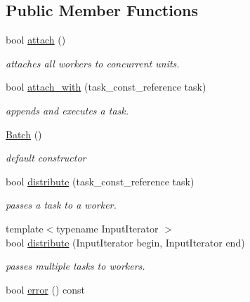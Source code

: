 \subsection*{Public Member Functions}
\begin{DoxyCompactItemize}
\item 
bool \hyperlink{classhryky_1_1task_1_1distributor_1_1_base_ae17d5723d8aa5567ea6a47b67f8133c4}{attach} ()
\begin{DoxyCompactList}\small\item\em attaches all workers to concurrent units. \end{DoxyCompactList}\item 
bool \hyperlink{group__task_ga54ecf037362d5f476c1cd9a984c1b720}{attach\-\_\-with} (task\-\_\-const\-\_\-reference task)
\begin{DoxyCompactList}\small\item\em appends and executes a task. \end{DoxyCompactList}\item 
\hyperlink{group__task_gabc2230b47631c13cfaa63fe5438b2b7f}{Batch} ()
\begin{DoxyCompactList}\small\item\em default constructor \end{DoxyCompactList}\item 
bool \hyperlink{group__task_gaaa80eb88fb7d7223214dd039ae52ed16}{distribute} (task\-\_\-const\-\_\-reference task)
\begin{DoxyCompactList}\small\item\em passes a task to a worker. \end{DoxyCompactList}\item 
{\footnotesize template$<$typename Input\-Iterator $>$ }\\bool \hyperlink{group__task_gaf62dc1e2c3d349ecd67f459d254550fd}{distribute} (Input\-Iterator begin, Input\-Iterator end)
\begin{DoxyCompactList}\small\item\em passes multiple tasks to workers. \end{DoxyCompactList}\item 
\hypertarget{classhryky_1_1task_1_1distributor_1_1_base_acd23149eb623c0e2e9c90cf0f1d6f87b}{bool \hyperlink{classhryky_1_1task_1_1distributor_1_1_base_acd23149eb623c0e2e9c90cf0f1d6f87b}{error} () const }\label{classhryky_1_1task_1_1distributor_1_1_base_acd23149eb623c0e2e9c90cf0f1d6f87b}


\end{DoxyCompactItemize}
